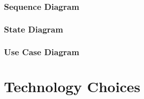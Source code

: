 \documentclass{article}
\begin{document}
			
			\subsubsection{Sequence Diagram}\label{subsec:uml-diagrams-users-seq}
						
			
			\subsubsection{State Diagram}\label{subsec:uml-diagrams-users-state}
			
			
			\subsubsection{Use Case Diagram}\label{subsec:uml-diagrams-users-uc}
		
		\clearpage

	\clearpage
	
	\section{Technology Choices}\label{sec:technology-choices}
\end{document}
